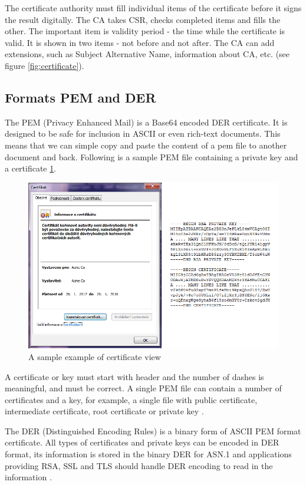 \documentclass[
  digital, %
  notable,   %
  lof,     %
  lot,     %
]{fithesis3}
\begin{document}
The certificate authority must fill individual items of the certificate before it signs 
the result digitally. The CA takes CSR, checks completed items and fills the other. The important item is validity period - the time while the certificate is valid. It is shown in two items - not before and not after. The CA can add extensions, such as Subject Alternative Name, information about CA, etc. (see figure \ref{fig:certificate}).

\subsection{Formats PEM and DER}
The PEM (Privacy Enhanced Mail) is a Base64 encoded DER certificate. It is designed 
to be safe for inclusion in ASCII or even rich-text documents. This means that we can simple 
copy and paste the content of a pem file to another document and back. Following is a sample 
PEM file containing a private key and a certificate \ref{fig:vzorPEM-DER}.

\begin{figure}[th]
	\centering
	\includegraphics[width=1\textwidth]{pem-der}
	\caption{A sample example of certificate view}
	\label{fig:vzorPEM-DER}
\end{figure}

A certificate or key must start with header and the number of dashes is meaningful, and must 
be correct. A single PEM file can contain a number of certificates and a key, for example, a 
single file with public certificate, intermediate certificate, root certificate or private key 
\cite{howToSsl}.

The DER (Distinguished Encoding Rules) is a binary form of ASCII PEM format 
certificate. All types of certificates and private keys can be encoded in DER format, its 
information is stored in the binary DER for ASN.1 and applications providing RSA, SSL and TLS 
should handle DER encoding to read in the information \cite{bakker_2014}.
\end{document}
